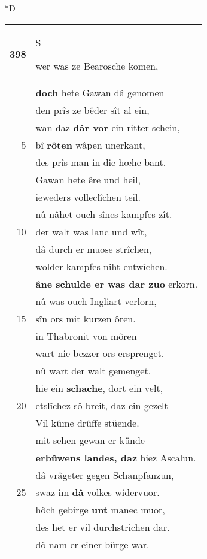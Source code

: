\documentclass[8pt,a4paper,notitlepage]{article}
\begin{document}
\begin{table}[ht]
\begin{minipage}[t]{0.5\linewidth}
\small
\begin{center}*D
\end{center}
\begin{tabular}{rl}
\textbf{398} & \begin{Large}S\end{Large}wer was ze Bearosche komen,\\ 
 & \textbf{doch} hete Gawan dâ genomen\\ 
 & den prîs ze bêder sît al ein,\\ 
 & wan daz \textbf{dâr vor} ein ritter schein,\\ 
5 & bî \textbf{rôten} wâpen unerkant,\\ 
 & des prîs man in die hœhe bant.\\ 
 & Gawan hete êre und heil,\\ 
 & ieweders volleclîchen teil.\\ 
 & nû nâhet ouch sînes kampfes zît.\\ 
10 & der walt was lanc und wît,\\ 
 & dâ durch er muose strîchen,\\ 
 & wolder kampfes niht entwîchen.\\ 
 & \textbf{âne schulde er was dar zuo} erkorn.\\ 
 & nû was ouch Ingliart verlorn,\\ 
15 & sîn ors mit kurzen ôren.\\ 
 & in Thabronit von môren\\ 
 & wart nie bezzer ors ersprenget.\\ 
 & nû wart der walt gemenget,\\ 
 & hie ein \textbf{schache}, dort ein velt,\\ 
20 & etslîchez sô breit, daz ein gezelt\\ 
 & Vil kûme drûffe stüende.\\ 
 & mit sehen gewan er künde\\ 
 & \textbf{erbûwens landes, daz} hiez Ascalun.\\ 
 & dâ vrâgeter gegen Schanpfanzun,\\ 
25 & swaz im \textbf{dâ} volkes widervuor.\\ 
 & hôch gebirge \textbf{unt} manec muor,\\ 
 & des het er vil durchstrichen dar.\\ 
 & dô nam er einer bürge war.\\ 

\end{tabular}
\end{minipage}
\end{table}
\end{document}
